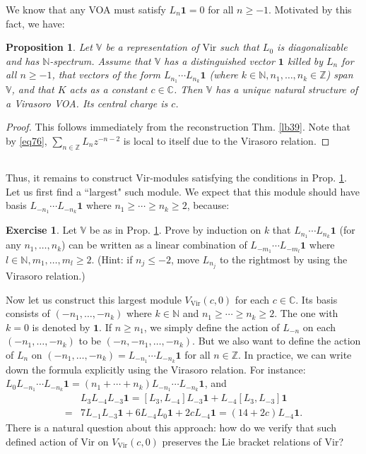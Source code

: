 \documentclass[12pt,a4paper,notitlepage]{article}
\theoremstyle{definition}
\newtheorem{exe}[df]{Exercise}
\theoremstyle{plain}
\newtheorem{pp}[df]{Proposition}
\newcommand{\id}{\mathbf{1}}
\newcommand{\Vir}{\mathrm{Vir}}
\newcommand{\Vbb}{\mathbb V}
\newcommand{\Cbb}{\mathbb C}
\newcommand{\Nbb}{\mathbb N}
\newcommand{\Zbb}{\mathbb Z}
\numberwithin{equation}{section}
\begin{document}
We know that any VOA must satisfy $L_n\id=0$ for all $n\geq-1$. Motivated by this fact, we have:
\begin{pp}\label{lb45}
Let $\Vbb$ be a representation of $\Vir$ such that $L_0$ is diagonalizable and has $\Nbb$-spectrum. Assume that $\Vbb$ has a distinguished vector $\id$ killed by $L_n$ for all $n\geq -1$,  that vectors of the form $L_{n_1}\cdots L_{n_k}\id$ (where $k\in\Nbb,n_1,\dots,n_k\in\Zbb$) span $\Vbb$, and that $K$ acts as a constant $c\in\Cbb$. Then $\Vbb$ has a unique natural structure of a Virasoro VOA. Its central charge is $c$.
\end{pp} 

\begin{proof}
This follows immediately from the reconstruction Thm. \ref{lb39}. Note that by \eqref{eq76}, $\sum_{n\in\Zbb}L_nz^{-n-2}$ is local to itself due to the Virasoro relation.
\end{proof}

\subsection{}


Thus, it remains to construct $\Vir$-modules satisfying the conditions in Prop. \ref{lb45}. Let us first find a ``largest" such module. We expect that this module should have basis $L_{-n_1}\cdots L_{-n_k}\id$ where $n_1\geq\cdots\geq n_k\geq 2$,  because:
\begin{exe}
Let $\Vbb$ be as in Prop. \ref{lb45}. Prove by induction on $k$ that $L_{n_1}\cdots L_{n_k}\id$ (for any $n_1,\dots,n_k$) can be written as a linear combination of $L_{-m_1}\cdots L_{-m_l}\id$ where $l\in\Nbb,m_1,\dots,m_l\geq2$. (Hint: if $n_j\leq -2$, move $L_{n_j}$ to the rightmost by using the Virasoro relation.)
\end{exe}

Now let us construct this largest module $V_\Vir(c,0)$ for each $c\in\Cbb$. Its basis consists of $(-n_1,\dots,-n_k)$ where $k\in\Nbb$ and $n_1\geq \cdots\geq n_k\geq2$. The one with $k=0$ is denoted by $\id$. If $n\geq n_1$, we simply define the action of $L_{-n}$ on each $(-n_1,\dots,-n_k)$ to be $(-n,-n_1,\dots,-n_k)$. But we also want to define the action of $L_n$ on $(-n_1,\dots,-n_k)=L_{-n_1}\cdots L_{-n_k}\id$ for all $n\in\Zbb$. In practice, we can write down the formula explicitly using the Virasoro relation. For instance: $L_0L_{-n_1}\cdots L_{-n_k}\id=(n_1+\cdots+n_k)L_{-n_1}\cdots L_{-n_k}\id$, and
\begin{align}
&L_3L_{-4}L_{-3}\id=[L_3,L_{-4}]L_{-3}\id+L_{-4}[L_3,L_{-3}]\id\nonumber\\
=&7L_{-1}L_{-3}\id+6L_{-4}L_0\id+2cL_{-4}\id=(14+2c)L_{-4}\id.\label{eq72}
\end{align}
There is a natural question about this approach: how do we verify that such defined action of $\Vir$ on $V_\Vir(c,0)$ preserves the Lie bracket relations of $\Vir$?
\end{document}
